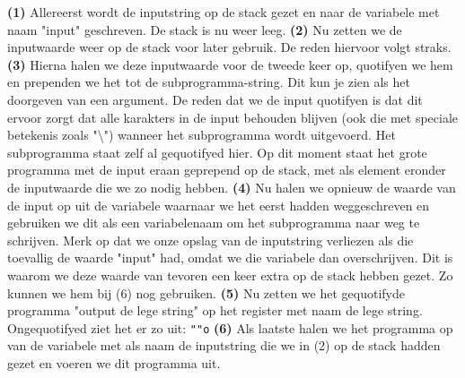 \textbf{(1)} Allereerst wordt de inputstring op de stack gezet en naar de variabele met naam "input" geschreven. De stack is nu weer leeg. \textbf{(2)} Nu zetten we de inputwaarde weer op de stack voor later gebruik. De reden hiervoor volgt straks.
\textbf{(3)} Hierna halen we deze inputwaarde voor de tweede keer op, quotifyen we hem en prependen we het tot de subprogramma-string. Dit kun je zien als het doorgeven van een argument. De reden dat we de input quotifyen is dat dit ervoor zorgt dat alle karakters in de input behouden blijven (ook die met speciale betekenis zoals "\textbackslash{}") wanneer het subprogramma wordt uitgevoerd. Het subprogramma staat zelf al gequotifyed hier.
Op dit moment staat het grote programma met de input eraan geprepend op de stack, met als element eronder de inputwaarde die we zo nodig hebben. \textbf{(4)} Nu halen we opnieuw de waarde van de input op uit de variabele waarnaar we het eerst hadden weggeschreven en gebruiken we dit als een variabelenaam om het subprogramma naar weg te schrijven. Merk op dat we onze opslag van de inputstring verliezen als die toevallig de waarde "input" had, omdat we die variabele dan overschrijven. Dit is waarom we deze waarde van tevoren een keer extra op de stack hebben gezet. Zo kunnen we hem bij (6) nog gebruiken. \textbf{(5)} Nu zetten we het gequotifyde programma "output de lege string" op het register met naam de lege string. Ongequotifyed ziet het er zo uit: \texttt{""o}
\textbf{(6)} Als laatste halen we het programma op van de variabele met als naam de inputstring die we in (2) op de stack hadden gezet en voeren we dit programma uit.